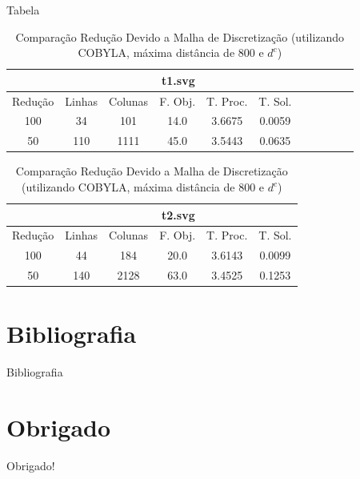 \documentclass[11pt]{beamer}
\begin{document}
\begin{frame}{Tabela}
\begin{table}
    \centering
    \caption{Comparação Redução Devido a Malha de Discretização (utilizando COBYLA, máxima distância de 800 e $d^c$)}
    \label{tab:reduce}
    \begin{tabular}{|c|c|c|c|c|c|c|c|c|c|c|}
        \hline
        & \multicolumn{5}{|c|}{t1.svg}  \\ \hline
        Redução & Linhas & Colunas & F. Obj. & T. Proc. & T. Sol. \\ \hline
        100 & 34 & 101 & 14.0 & 3.6675 & 0.0059 \\ \hline
        50 & 110 & 1111 & 45.0 & 3.5443 & 0.0635 \\ \hline
    \end{tabular}
    \begin{tabular}{|c|c|c|c|c|c|}
        \hline
        & \multicolumn{5}{|c|}{t2.svg} \\ \hline
        Redução & Linhas & Colunas & F. Obj. & T. Proc. & T. Sol. \\ \hline
        100 & 44 & 184 & 20.0 & 3.6143 & 0.0099 \\ \hline
        50 & 140 & 2128 & 63.0 & 3.4525 & 0.1253 \\ \hline
    \end{tabular}
\end{table}
\end{frame}

\section*{Bibliografia}
\begin{frame}{Bibliografia}


\end{frame}

\section*{Obrigado}
\begin{frame}
    \begin{center}
        Obrigado!
    \end{center}
\end{frame}
\end{document}
